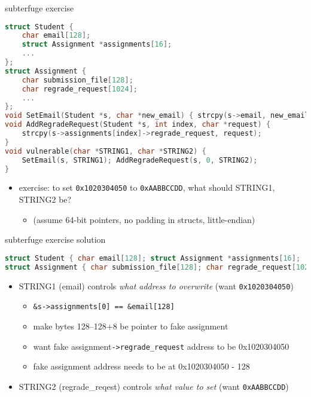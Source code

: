 \begin{frame}[fragile,label=subterExer]{subterfuge exercise}
\begin{lstlisting}[language=C++,style=script]
struct Student {
    char email[128];
    struct Assignment *assignments[16];
    ...
};
struct Assignment {
    char submission_file[128];
    char regrade_request[1024];
    ...
};
void SetEmail(Student *s, char *new_email) { strcpy(s->email, new_email); }
void AddRegradeRequest(Student *s, int index, char *request) {
    strcpy(s->assignments[index]->regrade_request, request);
}
void vulnerable(char *STRING1, char *STRING2) {
    SetEmail(s, STRING1); AddRegradeRequest(s, 0, STRING2);
}
\end{lstlisting}
\begin{itemize}
\item exercise: to set \texttt{0x1020304050} to \texttt{0xAABBCCDD}, what should STRING1, STRING2 be?
    \begin{itemize}
    \item (assume 64-bit pointers, no padding in structs, little-endian)
    \end{itemize}
\end{itemize}
\end{frame}

\begin{frame}[fragile,label=subterExerSoln]{subterfuge exercise solution}
\begin{lstlisting}[language=C++,style=script]
struct Student { char email[128]; struct Assignment *assignments[16]; ...  };
struct Assignment { char submission_file[128]; char regrade_request[1024]; ...  };
\end{lstlisting}
\begin{itemize}
\item STRING1 (email) controls \textit{what address to overwrite} (want \texttt{0x1020304050})
    \begin{itemize}
    \item \verb|&s->assignments[0] == &email[128]|
    \item make bytes 128--128+8 be pointer to fake assignment
    \item want fake assignment\verb|->regrade_request| address to be 0x1020304050
    \item fake assignment address needs to be at 0x1020304050 -  128
    \end{itemize}
\item STRING2 (regrade\_reqest) controls \textit{what value to set} (want \texttt{0xAABBCCDD})
\end{itemize}
\end{frame}
